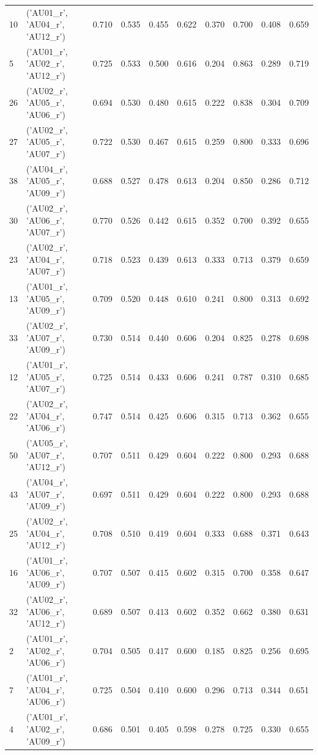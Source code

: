 \begin{tabular}{llrrrrrrrr}
10 & ('AU01_r', 'AU04_r', 'AU12_r') & 0.710 & 0.535 & 0.455 & 0.622 & 0.370 & 0.700 & 0.408 & 0.659 \\
5 & ('AU01_r', 'AU02_r', 'AU12_r') & 0.725 & 0.533 & 0.500 & 0.616 & 0.204 & 0.863 & 0.289 & 0.719 \\
26 & ('AU02_r', 'AU05_r', 'AU06_r') & 0.694 & 0.530 & 0.480 & 0.615 & 0.222 & 0.838 & 0.304 & 0.709 \\
27 & ('AU02_r', 'AU05_r', 'AU07_r') & 0.722 & 0.530 & 0.467 & 0.615 & 0.259 & 0.800 & 0.333 & 0.696 \\
38 & ('AU04_r', 'AU05_r', 'AU09_r') & 0.688 & 0.527 & 0.478 & 0.613 & 0.204 & 0.850 & 0.286 & 0.712 \\
30 & ('AU02_r', 'AU06_r', 'AU07_r') & 0.770 & 0.526 & 0.442 & 0.615 & 0.352 & 0.700 & 0.392 & 0.655 \\
23 & ('AU02_r', 'AU04_r', 'AU07_r') & 0.718 & 0.523 & 0.439 & 0.613 & 0.333 & 0.713 & 0.379 & 0.659 \\
13 & ('AU01_r', 'AU05_r', 'AU09_r') & 0.709 & 0.520 & 0.448 & 0.610 & 0.241 & 0.800 & 0.313 & 0.692 \\
33 & ('AU02_r', 'AU07_r', 'AU09_r') & 0.730 & 0.514 & 0.440 & 0.606 & 0.204 & 0.825 & 0.278 & 0.698 \\
12 & ('AU01_r', 'AU05_r', 'AU07_r') & 0.725 & 0.514 & 0.433 & 0.606 & 0.241 & 0.787 & 0.310 & 0.685 \\
22 & ('AU02_r', 'AU04_r', 'AU06_r') & 0.747 & 0.514 & 0.425 & 0.606 & 0.315 & 0.713 & 0.362 & 0.655 \\
50 & ('AU05_r', 'AU07_r', 'AU12_r') & 0.707 & 0.511 & 0.429 & 0.604 & 0.222 & 0.800 & 0.293 & 0.688 \\
43 & ('AU04_r', 'AU07_r', 'AU09_r') & 0.697 & 0.511 & 0.429 & 0.604 & 0.222 & 0.800 & 0.293 & 0.688 \\
25 & ('AU02_r', 'AU04_r', 'AU12_r') & 0.708 & 0.510 & 0.419 & 0.604 & 0.333 & 0.688 & 0.371 & 0.643 \\
16 & ('AU01_r', 'AU06_r', 'AU09_r') & 0.707 & 0.507 & 0.415 & 0.602 & 0.315 & 0.700 & 0.358 & 0.647 \\
32 & ('AU02_r', 'AU06_r', 'AU12_r') & 0.689 & 0.507 & 0.413 & 0.602 & 0.352 & 0.662 & 0.380 & 0.631 \\
2 & ('AU01_r', 'AU02_r', 'AU06_r') & 0.704 & 0.505 & 0.417 & 0.600 & 0.185 & 0.825 & 0.256 & 0.695 \\
7 & ('AU01_r', 'AU04_r', 'AU06_r') & 0.725 & 0.504 & 0.410 & 0.600 & 0.296 & 0.713 & 0.344 & 0.651 \\
4 & ('AU01_r', 'AU02_r', 'AU09_r') & 0.686 & 0.501 & 0.405 & 0.598 & 0.278 & 0.725 & 0.330 & 0.655 \\

\end{tabular}
